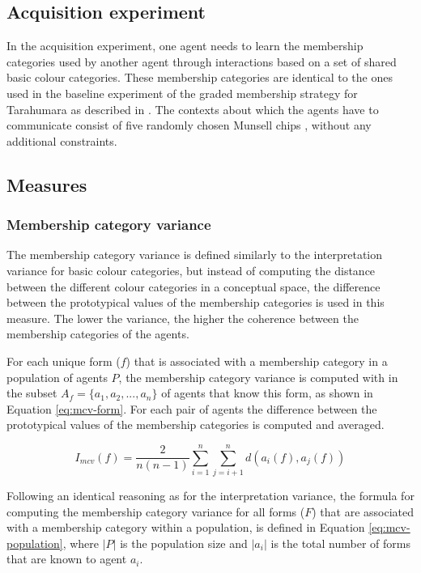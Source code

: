 \subsection{Acquisition experiment}

In the acquisition experiment, one agent needs to learn the membership
categories used by another agent through interactions based on a set
of shared basic colour categories. These membership categories are
identical to the ones used in the baseline experiment of the
graded membership strategy for Tarahumara as described in
. The contexts about which the
agents have to communicate consist of five randomly chosen Munsell
chips \citep{newhall42final}, without any additional constraints.

\subsection{Measures}

\subsubsection{Membership category variance}

The membership category variance is defined similarly to the
interpretation variance for basic colour categories, but instead of
computing the distance between the different colour categories in a
conceptual space, the difference between the prototypical values of
the membership categories is used in this measure. The lower the
variance, the higher the coherence between the membership categories
of the agents.

For each unique form ($f$) that is associated with a membership category
in a population of agents $P$, the membership category variance is
computed with in the subset $A_f = \{a_1, a_2, ..., a_n\}$ of agents
that know this form, as shown in Equation \ref{eq:mcv-form}. For each
pair of agents the difference between the prototypical values of the
membership categories is computed and averaged.

\begin{equation}
I_{mcv}(f) = \frac{2}{n(n-1)} \sum^n_{i=1} \sum^n_{j=i+1} d(a_i(f), a_j(f))
\label{eq:mcv-form}
\end{equation}

Following an identical reasoning as for the interpretation variance,
the formula for computing the membership category variance for all
forms ($F$) that are associated with a membership category within a
population, is defined in Equation \ref{eq:mcv-population}, where
$|P|$ is the population size and $|a_i|$ is the total number of forms
that are known to agent $a_i$.

